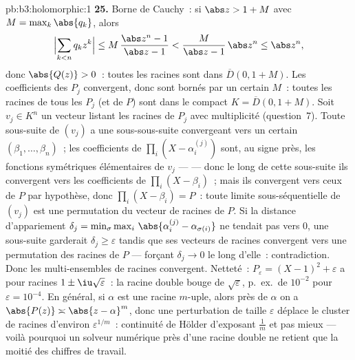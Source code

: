 \begin{solution}{pb:b3:holomorphic:1}
\textbf{25.} Borne de Cauchy~: si $\abs z > 1 + M$ avec $M =
\max_k\abs{q_k}$, alors
\[
\Bigl|\sum_{k<n}q_kz^k\Bigr|
\leq M\,\frac{\abs z^n - 1}{\abs z - 1}
< \frac{M}{\abs z - 1}\,\abs z^n \leq \abs z^n,
\]
donc $\abs{Q(z)} > 0$~: toutes les racines sont dans
$\overline D(0, 1+M)$. Les coefficients des $P_j$
convergent, donc sont bornés par un certain $M$~: toutes les
racines de tous les $P_j$ (et de $P$) sont dans le compact
$K = \overline D(0, 1 + M)$. Soit $v_j \in K^n$ un vecteur
listant les racines de $P_j$ avec multiplicité
(question~7). Toute sous-suite de $(v_j)$ a une
sous-sous-suite convergeant vers un certain $(\beta_1,
\dots, \beta_n)$~; les coefficients de $\prod_i(X -
\alpha_i^{(j)})$ sont, au signe près, les fonctions
symétriques élémentaires de $v_j$ ---  --- donc le
long de cette sous-suite ils convergent vers les
coefficients de $\prod_i(X - \beta_i)$~; mais ils
convergent vers ceux de $P$ par hypothèse, donc $\prod_i(X -
\beta_i) = P$~: toute limite sous-séquentielle de $(v_j)$
est une permutation du vecteur de racines de $P$. Si la
distance d'appariement $\delta_j =
\min_\sigma\max_i\,\abs{\alpha_i^{(j)} -
\alpha_{\sigma(i)}}$ ne tendait pas vers $0$, une sous-suite
garderait $\delta_j \geq \varepsilon$ tandis que ses
vecteurs de racines convergent vers une permutation des
racines de $P$ --- forçant $\delta_j \to 0$ le long d'elle~:
contradiction. Donc les multi-ensembles de racines
convergent. Netteté~: $P_\varepsilon = (X - 1)^2 +
\varepsilon$ a pour racines $1 \pm \iu\sqrt\varepsilon$~: la
racine double bouge de $\sqrt\varepsilon$, p.\ ex.\ de
$10^{-2}$ pour $\varepsilon = 10^{-4}$. En général, si
$\alpha$ est une racine $m$-uple, alors près de $\alpha$ on
a $\abs{P(z)} \asymp \abs{z - \alpha}^m$, donc une
perturbation de taille $\varepsilon$ déplace le cluster de
racines d'environ $\varepsilon^{1/m}$~: continuité de Hölder
d'exposant $\frac1m$ et pas mieux --- voilà pourquoi un
solveur numérique près d'une racine double ne retient que la
moitié des chiffres de travail.
\end{solution}
